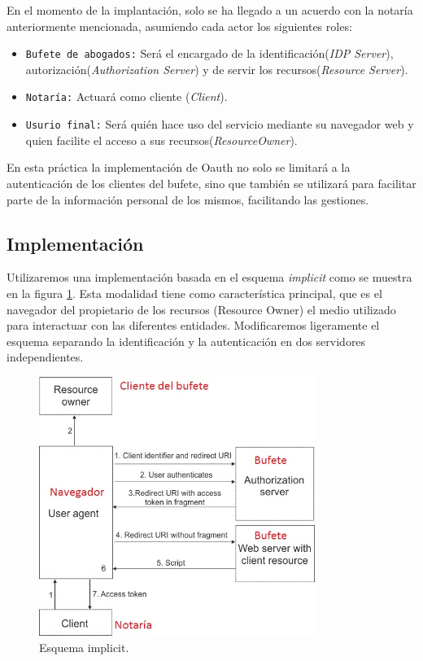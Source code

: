 \documentclass[a4,12pt,onecolum]{article}
\begin{document}
En el momento de la implantación, solo se ha llegado a un acuerdo con la notaría anteriormente mencionada, asumiendo cada actor los siguientes roles:
\begin{itemize}
\item \texttt{Bufete de abogados:} Será el encargado de la identificación(\emph{IDP Server}), autorización(\emph{Authorization Server}) y de servir los recursos(\emph{Resource Server}).
\item \texttt{Notaría:} Actuará como cliente (\emph{Client}).
\item \texttt{Usurio final:} Será quién hace uso del servicio mediante su navegador web y quien facilite el acceso a sus recursos(\emph{ResourceOwner}).
\end{itemize}

En esta práctica la implementación de Oauth no solo se limitará a la autenticación de los clientes del bufete, sino que también se utilizará para facilitar parte de la información personal de los mismos, facilitando las gestiones.


\subsection{Implementación}
Utilizaremos una implementación basada en el esquema \emph{implicit} como se muestra en la figura \ref{fig:oauth1}. Esta modalidad tiene como característica principal, que es el navegador del propietario de los recursos (Resource Owner) el medio utilizado para interactuar con las diferentes entidades. Modificaremos ligeramente el esquema separando la identificación y la autenticación en dos servidores independientes.	\\

\begin{figure}[htbp]
\centering
\includegraphics[width=0.8\textwidth]{./images/oauth/implicit.jpg}
\caption{Esquema implicit.}
\label{fig:oauth1}
\end{figure}
\end{document}
